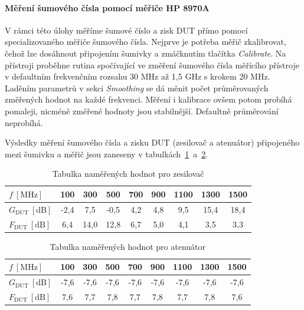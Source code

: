 \documentclass[11pt,a4paper]{article}
\begin{document}
\paragraph*{Měření šumového čísla pomocí měřiče HP 8970A} V rámci této úlohy měříme šumové číslo a zisk DUT přímo pomocí specializovaného měřiče šumového čísla. Nejprve je potřeba měřič zkalibrovat, čehož lze dosáhnout připojením šumivky a zmáčknutím tlačítka \emph{Calibrate}. Na přístroji proběhne rutina spočívající ve změření šumového čísla měřícího přístroje v defaultním frekvenčním rozsahu 30 MHz až 1,5 GHz s krokem 20 MHz. Laděním parametrů v sekci
\emph{Smoothing} se dá měnit počet průměrovaných změřených hodnot na každé frekvenci. Měření i kalibrace ovšem potom probíhá pomaleji, nicméně změřené hodnoty jsou stabilnější. Defaultně průměrování neprobíhá.

Výsledky měření šumového čísla a zisku DUT (zesilovač a atenuátor) připojeného mezi šumivku a měřič jsou zaneseny v tabulkách~\ref{table:task3-amp}~a~\ref{table:task3-att}.
\begin{table}[!ht]
\begin{center}
\begin{tabular}{| l || c | c | c | c | c | c | c | c |}
    \hline
    $f \ [\mathrm{MHz}]$ & 100 & 300 & 500 & 700 & 900 & 1100 & 1300 & 1500 \\
    \hline\hline
    $G_{\mathrm{DUT}} \ [\mathrm{dB}]$ & -2,4 & 7,5 & -0,5 & 4,2 & 4,8 & 9,5 & 15,4 & 18,4 \\
    \hline
    $F_{\mathrm{DUT}} \ [\mathrm{dB}]$ & 6,4 & 14,0 & 12,8 & 6,7 & 5,0 & 4,1 & 3,5 & 3,3 \\
    \hline
\end{tabular}
\caption{Tabulka naměřených hodnot pro zesilovač}
\label{table:task3-amp}
\end{center}
\end{table}

\begin{table}[!ht]
\begin{center}
\begin{tabular}{| l || c | c | c | c | c | c | c | c |}
    \hline
    $f \ [\mathrm{MHz}]$ & 100 & 300 & 500 & 700 & 900 & 1100 & 1300 & 1500 \\
    \hline\hline
    $G_{\mathrm{DUT}} \ [\mathrm{dB}]$ & -7,6 & -7,6 & -7,6 & -7,6 & -7,6 & -7,6 & -7,6 & -7,6 \\
    \hline
    $F_{\mathrm{DUT}} \ [\mathrm{dB}]$ & 7,6 & 7,7 & 7,8 & 7,7 & 7,8 & 7,7 & 7,8 & 7,6 \\
    \hline
\end{tabular}
\caption{Tabulka naměřených hodnot pro atenuátor}
\label{table:task3-att}
\end{center}
\end{table}
\end{document}
